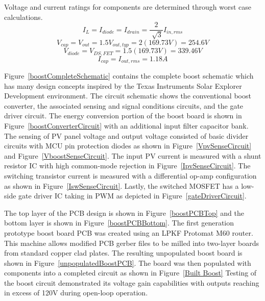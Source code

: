 Voltage and current ratings for components are determined through worst case calculations.\cite{kwasinski} 
\begin{equation}
I_L = I_{diode} = I_{drain} = \frac{2}{\sqrt[]{3}}I_{in,rms} 
\end{equation}
\begin{equation}
 V_{cap} = V_{out} = 1.5V_{out,typ} = 2(169.73V) = 254.6V 
\end{equation}
\begin{equation}
 V_{diode} = V_{DS,FET} = 1.5(169.73V) =339.46V  
\end{equation}
\begin{equation}
I_{cap} = I_{out,rms} = 1.18A 
\end{equation}

Figure~\ref{boostCompleteSchematic} contains the complete boost schematic which has many design concepts inspired by the Texas Instruments Solar Explorer Development environment.\cite{tiAppReportControl} The circuit schematic shows the conventional boost converter, the associated sensing and signal conditions circuits, and the gate driver circuit. The energy conversion portion of the boost board is shown in Figure~\ref{boostConverterCircuit} with an additional input filter capacitor bank. The sensing of PV panel voltage and output voltage consisted of basic divider circuits with MCU pin protection diodes as shown in Figure~\ref{VpvSenseCircuit} and Figure~\ref{VboostSenseCircuit}. The input PV current is measured with a shunt resistor IC with high common-mode rejection in Figure~\ref{IpvSenseCircuit}. The switching transistor current is measured with a differential op-amp configuration as shown in Figure~\ref{IswSenseCircuit}. Lastly, the switched MOSFET has a low-side gate driver IC taking in PWM as depicted in Figure~\ref{gateDriverCircuit}. 

The top layer of the PCB design is shown in Figure~\ref{boostPCBTop} and the bottom layer is shown in Figure~\ref{boostPCBBottom}. The first generation prototype boost board PCB was created using an LPKF Protomat M60 router. This machine allows modified PCB gerber files to be milled into two-layer boards from standard copper clad plates. The resulting unpopulated boost board is shown in Figure~\ref{unpopulatedBoostPCB}. The board was then populated with components into a completed circuit as shown in Figure~\ref{Built Boost} Testing of the boost circuit demonstrated its voltage gain capabilities with outputs reaching in excess of 120V during open-loop operation.

